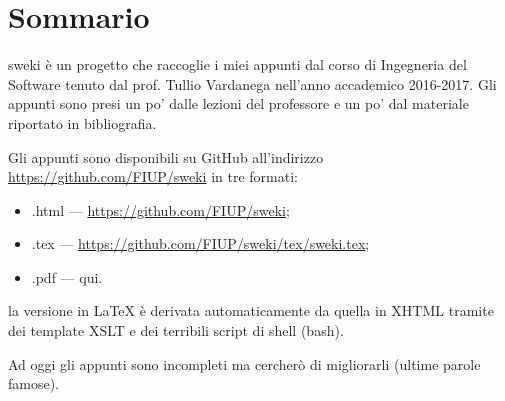 \section{Sommario}
sweki è un progetto che raccoglie i miei appunti dal corso di Ingegneria del Software tenuto dal prof. Tullio Vardanega nell'anno accademico 2016-2017. Gli appunti sono presi un po' dalle lezioni del professore e un po' dal materiale riportato in bibliografia.

Gli appunti sono disponibili su GitHub all'indirizzo \url{https://github.com/FIUP/sweki} in tre formati:
\begin{itemize}
	\item .html --- \url{https://github.com/FIUP/sweki};
	\item .tex --- \url{https://github.com/FIUP/sweki/tex/sweki.tex};
	\item .pdf --- qui.
\end{itemize}

la versione in \LaTeX{} è derivata automaticamente da quella in XHTML tramite dei template XSLT e dei terribili script di shell (bash).

Ad oggi gli appunti sono incompleti ma cercherò di migliorarli (ultime parole famose).
